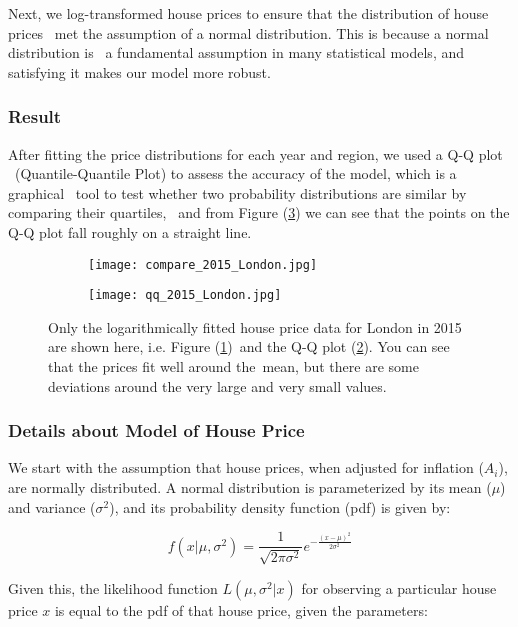 \documentclass[12pt]{article}  %
\begin{document}
Next, we log-transformed house prices to ensure that the distribution of house prices \
met the assumption of a normal distribution. This is because a normal distribution is \
a fundamental assumption in many statistical models, and satisfying it makes our model more robust.
\subsubsection{Result}
After fitting the price distributions for each year and region, we used a Q-Q plot \
(Quantile-Quantile Plot) to assess the accuracy of the model, which is a graphical \
tool to test whether two probability distributions are similar by comparing their quartiles, \
and from Figure (\ref{fig:qq}) we can see that the points on the Q-Q plot fall roughly on a straight line.

\begin{figure}[htbp]
    \centering
    \begin{subfigure}[b]{.5\textwidth}
        \texttt{[image: compare\_2015\_London.jpg]}
        \caption{}\label{subfig:hist}
    \end{subfigure}
    \begin{subfigure}[b]{.4\textwidth}
        \texttt{[image: qq\_2015\_London.jpg]}
        \caption{}\label{subfig:qq}
    \end{subfigure}
    \caption{Only the logarithmically fitted house price data for London in 2015 are shown here, i.e. Figure (\ref{subfig:hist})\
    and the Q-Q plot (\ref{subfig:qq}). You can see that the prices fit well around the\
    mean, but there are some deviations around the very large and very small values.
    }\label{fig:qq}
\end{figure}

\subsubsection{Details about Model of House Price}
We start with the assumption that house prices, when adjusted for inflation ($A_i$), are normally distributed. A normal distribution is parameterized by its mean ($\mu$) and variance ($\sigma^2$), and its probability density function (pdf) is given by:

\begin{equation}
f(x|\mu, \sigma^2)=\frac{1}{\sqrt{2\pi\sigma^2}} e^{-\frac{(x-\mu)^2}{2\sigma^2}}
\end{equation}

Given this, the likelihood function $L(\mu, \sigma^2|x)$ for observing a particular house price $x$ is equal to the pdf of that house price, given the parameters:
\end{document}
